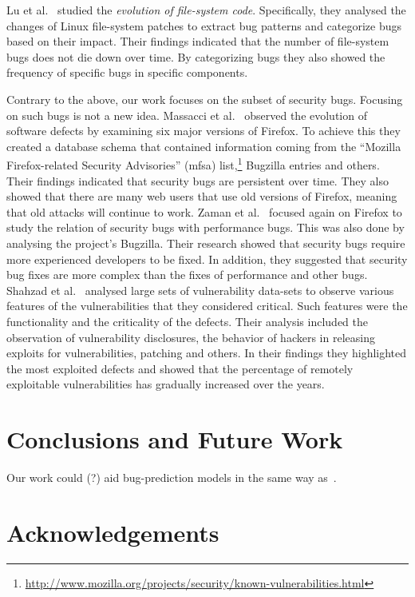 \documentclass[conference]{llncs}
\begin{document}
Lu et al.~\cite{LAAL13} studied the {\it evolution of file-system code}.
Specifically, they analysed the changes of Linux file-system patches to extract
bug patterns and categorize bugs based on their impact. Their findings
indicated that the number of file-system bugs does not die down over time. By
categorizing bugs they also showed the frequency of specific bugs in specific
components.

Contrary to the above, our work focuses on the subset of security bugs.
Focusing on such bugs is not a new idea. Massacci et al.~\cite{MNN11} observed
the evolution of software defects by examining six major versions of Firefox.
To achieve this they created a database schema that contained information
coming from the ``Mozilla Firefox-related Security Advisories'' ({\sc mfsa})
list,\footnote{\url{http://www.mozilla.org/projects/security/known-vulnerabilities.html}}
Bugzilla entries and others. Their findings indicated that security bugs are
persistent over time. They also showed that there are many web users that use
old versions of Firefox, meaning that old attacks will continue to work.
Zaman et al.~\cite{ZAH11} focused again on Firefox to study the relation of
security bugs with performance bugs. This was also done by analysing the project's
Bugzilla. Their research showed that security bugs require more experienced developers
to be fixed. In addition, they suggested that security bug fixes are more complex than the
fixes of performance and other bugs.
Shahzad et al.~\cite{SSL12} analysed large sets of vulnerability data-sets to observe
various features of the vulnerabilities that they considered critical. Such features
were the functionality and the criticality of the defects. Their analysis
included the observation of vulnerability disclosures, the behavior of
hackers in releasing exploits for vulnerabilities, patching and others. In
their findings they highlighted the most exploited defects and showed that
the percentage of remotely exploitable vulnerabilities has gradually increased
over the years.

\section{Conclusions and Future Work}
\label{sec:con}

Our work could (?) aid bug-prediction models in the same way as~\cite{BN11}.

\section*{Acknowledgements}
\end{document}
